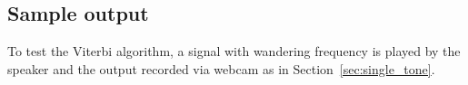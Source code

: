 \documentclass[paper-main.tex]{subfiles}
\begin{document}

\subsection{Sample output}
\label{sec:wanderingResults}

To test the Viterbi algorithm, a signal with wandering frequency is played by the speaker and the output recorded via webcam as in Section~\ref{sec:single_tone}.
\end{document}
